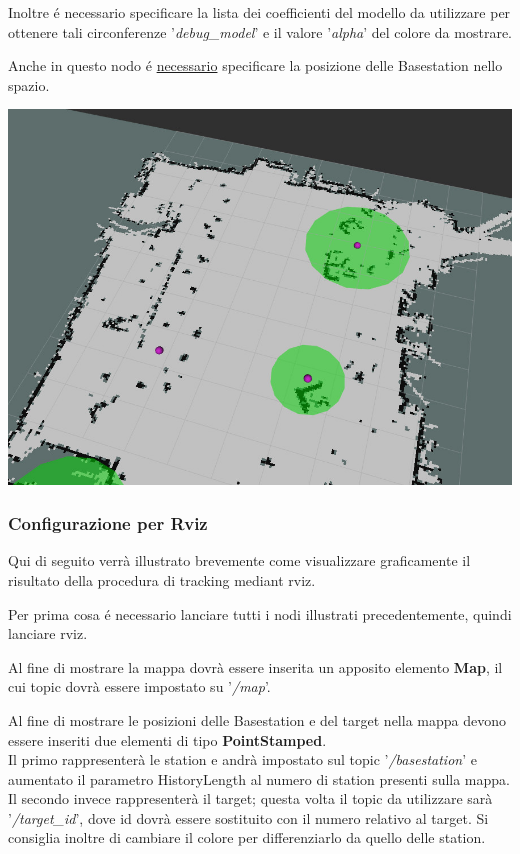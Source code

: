 \documentclass{article}
\begin{document}
Inoltre \'e necessario specificare la lista dei coefficienti del modello da utilizzare per ottenere tali circonferenze '\textit{debug\_model}' e il valore '\textit{alpha}' del colore da mostrare.

Anche in questo nodo \'e \underline{necessario} specificare la posizione delle Basestation nello spazio.

\begin{center}
	\includegraphics[scale=0.4]{manual_imgs/measurement_debug}
\end{center}


\subsubsection{Configurazione per Rviz}
Qui di seguito verr\`a illustrato brevemente come visualizzare graficamente il risultato della procedura di tracking mediant rviz.

Per prima cosa \'e necessario lanciare tutti i nodi illustrati precedentemente, quindi lanciare rviz.

Al fine di mostrare la mappa dovr\`a essere inserita un apposito elemento \textbf{Map}, il cui topic dovr\`a essere impostato su '\textit{/map}'.

Al fine di mostrare le posizioni delle Basestation e del target nella mappa devono essere inseriti due elementi di tipo \textbf{PointStamped}. \\
Il primo rappresenter\`a le station e andr\`a impostato sul topic '\textit{/basestation}' e aumentato il parametro HistoryLength al numero di station presenti sulla mappa.\\
Il secondo invece rappresenter\`a il target; questa volta il topic da utilizzare sar\`a '\textit{/target\_id}', dove id dovr\`a essere sostituito con il numero relativo al target.
Si consiglia inoltre di cambiare il colore per differenziarlo da quello delle station.
\end{document}
